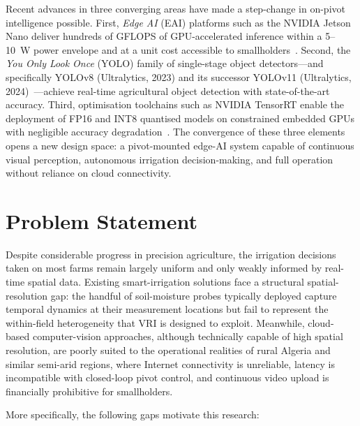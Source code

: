 \documentclass[12pt,a4paper]{report}
\newcommand{\abbr}[2]{\emph{#1} (#2)}
\begin{document}
Recent advances in three converging areas have made a step-change in on-pivot intelligence possible. First, \abbr{Edge AI}{EAI} platforms such as the NVIDIA Jetson Nano deliver hundreds of GFLOPS of GPU-accelerated inference within a 5--10~W power envelope and at a unit cost accessible to smallholders~\cite{Shi2016}. Second, the \abbr{You Only Look Once}{YOLO} family of single-stage object detectors---and specifically YOLOv8 (Ultralytics, 2023) and its successor YOLOv11 (Ultralytics, 2024)~\cite{Jocher2023,Ultralytics2024}---achieve real-time agricultural object detection with state-of-the-art accuracy. Third, optimisation toolchains such as NVIDIA TensorRT enable the deployment of FP16 and INT8 quantised models on constrained embedded GPUs with negligible accuracy degradation~\cite{Jacob2018}. The convergence of these three elements opens a new design space: a pivot-mounted edge-AI system capable of continuous visual perception, autonomous irrigation decision-making, and full operation without reliance on cloud connectivity.

\section{Problem Statement}

Despite considerable progress in precision agriculture, the irrigation decisions taken on most farms remain largely uniform and only weakly informed by real-time spatial data. Existing smart-irrigation solutions face a structural spatial-resolution gap: the handful of soil-moisture probes typically deployed capture temporal dynamics at their measurement locations but fail to represent the within-field heterogeneity that VRI is designed to exploit. Meanwhile, cloud-based computer-vision approaches, although technically capable of high spatial resolution, are poorly suited to the operational realities of rural Algeria and similar semi-arid regions, where Internet connectivity is unreliable, latency is incompatible with closed-loop pivot control, and continuous video upload is financially prohibitive for smallholders.

More specifically, the following gaps motivate this research:
\end{document}
